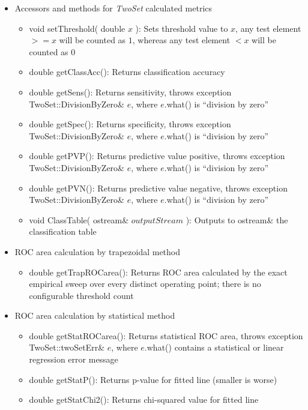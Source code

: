 \documentclass{report}
\begin{document}
\begin{itemize}
\begin{itemize}
\item Accessors and methods for {\em TwoSet} calculated metrics
\begin{itemize}
\item void setThreshold( double $x$ ): Sets threshold value to $x$,
      any test element $>=x$ will be counted as $1$, whereas any test
      element $<x$ will be counted as $0$
\item double getClassAcc(): Returns classification accuracy
\item double getSens(): Returns sensitivity, throws exception
      TwoSet::DivisionByZero\& $e$, where $e$.what() is ``division by
      zero''
\item double getSpec(): Returns specificity, throws exception
      TwoSet::DivisionByZero\& $e$, where $e$.what() is ``division by
      zero''
\item double getPVP(): Returns predictive value positive, throws
      exception TwoSet::DivisionByZero\& $e$, where $e$.what() is
      ``division by zero''
\item double getPVN(): Returns predictive value negative, throws
      exception TwoSet::DivisionByZero\& $e$, where $e$.what() is
      ``division by zero''
\item void ClassTable( ostream\& $outputStream$ ): Outputs to
ostream\&
      the classification table
\end{itemize}

\item ROC area calculation by trapezoidal method
\begin{itemize}
\item double getTrapROCarea(): Returns ROC area calculated by
      the exact empirical sweep over every distinct operating point; there is
      no configurable threshold count
\end{itemize}

\item ROC area calculation by statistical method
\begin{itemize}
\item double getStatROCarea(): Returns statistical ROC area, throws
      exception TwoSet::twoSetErr\& $e$, where $e$.what() contains a
      statistical or linear regression error message
\item double getStatP(): Returns p-value for fitted line (smaller is
      worse)
\item double getStatChi2(): Returns chi-squared value for fitted line
\end{itemize}


\end{itemize}
\end{itemize}
\end{document}
